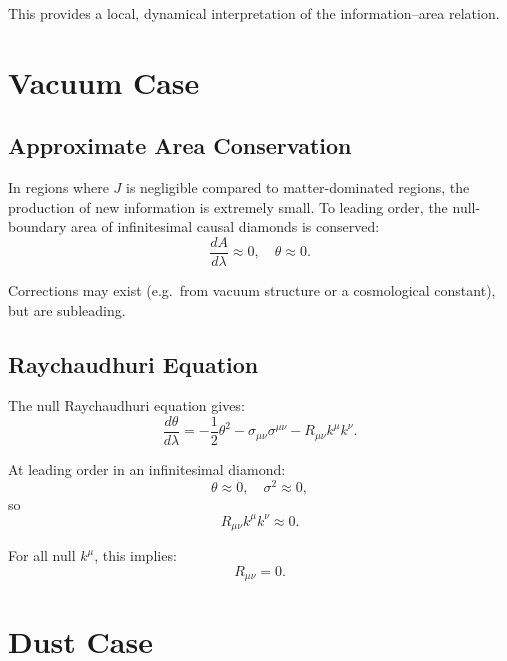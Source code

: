 \documentclass[12pt]{article}
\begin{document}
This provides a local, dynamical interpretation of the
information--area relation.

\section{Vacuum Case}

\subsection{Approximate Area Conservation}

In regions where $J$ is negligible compared to matter-dominated
regions, the production of new information is extremely small.
To leading order, the null-boundary area of infinitesimal causal
diamonds is conserved:
\begin{equation}
\frac{dA}{d\lambda} \approx 0,
\quad
\theta \approx 0.
\end{equation}

Corrections may exist (e.g.\ from vacuum structure or a
cosmological constant), but are subleading.

\subsection{Raychaudhuri Equation}

The null Raychaudhuri equation gives:
\begin{equation}
\frac{d\theta}{d\lambda}
= -\frac{1}{2}\theta^2
- \sigma_{\mu\nu}\sigma^{\mu\nu}
- R_{\mu\nu}k^\mu k^\nu.
\end{equation}

At leading order in an infinitesimal diamond:
\begin{equation}
\theta \approx 0, \quad
\sigma^2 \approx 0,
\end{equation}
so
\begin{equation}
R_{\mu\nu}k^\mu k^\nu \approx 0.
\end{equation}

For all null $k^\mu$, this implies:
\begin{equation}
R_{\mu\nu} = 0.
\end{equation}

\section{Dust Case}
\end{document}
